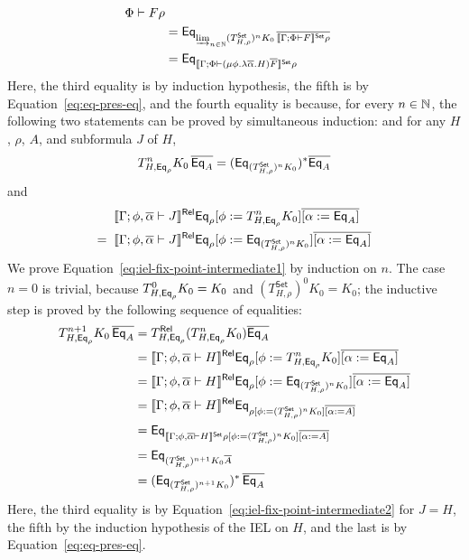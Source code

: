 \documentclass{lmcs}
\theoremstyle{plain}\newtheorem{satz}[thm]{Satz}
\newcommand{\set}{\mathsf{Set}}
\begin{document}
\begin{itemize}
\[\begin{split}
{{{{        \Phi \vdash F}\rho}}}\\ 
&= \Eq_{\colim{n \in \nat}{ (T^\set_{H,\rho})^n K_0\,
    \ol{\setsem{\Gamma; \Phi \vdash F}\rho}}}\\
&= \Eq_{\setsem{\Gamma; \Phi \vdash (\mu \phi.\lambda
      \ol{\alpha}. H)\ol{F}}\rho}
\end{split}
\]
Here, the third equality is by induction hypothesis, the fifth is by
Equation~\ref{eq:eq-pres-eq}, and the fourth equality is because, for
every $n \in \mathbb{N}$, the following two statements can be proved by
simultaneous induction: and for any $H$, $\rho$, $A$, and subformula
$J$ of $H$,
\begin{equation}\label{eq:iel-fix-point-intermediate1}
T^n_{H, \Eq_{\rho}} K_0\, \ol{\Eq_A} = (\Eq_{(T^\set_{H, \rho})^n K_0})^*
\ol{\Eq_A}
\end{equation}
and 
\begin{equation}\label{eq:iel-fix-point-intermediate2}
\begin{split}
& \relsem{\Gamma; \phi, \ol{\alpha} \vdash J} \Eq_{\rho} [\phi
    := T^{n}_{H,\Eq_{\rho}} K_0] \overline{[\alpha := \Eq_A]} \\
=\;\; & \relsem{\Gamma; \phi, \ol{\alpha} \vdash J} \Eq_{\rho}
[\phi := \Eq_{(T^\set_{H,\rho})^n K_0}] \overline{[\alpha := \Eq_A]}
\end{split}
\end{equation}
We prove Equation~\ref{eq:iel-fix-point-intermediate1} by induction on
$n$.  The case $n=0$ is trivial, because $T^0_{H,\mathsf{Eq}_{\rho}} K_0 =
K_0$ and $(T^\set_{H,\rho})^0 K_0 = K_0$; the inductive step is proved
by the following sequence of equalities:
\[
\begin{split}
T^{n+1}_{H,\Eq_{\rho}} K_0\, \overline{\Eq_A}
&= T^\rel_{H,\Eq_{\rho}} (T^{n}_{H,\Eq_{\rho}} K_0)
\overline{\Eq_A} \\ 
&= \relsem{\Gamma; \phi, \ol{\alpha} \vdash H} \Eq_{\rho} [\phi
  := T^{n}_{H, \Eq_{\rho}} K_0] \overline{[\alpha :=
    \Eq_A]} \\ 
&= \relsem{\Gamma; \phi, \ol{\alpha} \vdash H} \Eq_{\rho} [\phi
  := \Eq_{(T^\set_{H,\rho})^n K_0}] \overline{[\alpha :=
    \Eq_A]} \\ 
&= \relsem{\Gamma; \phi, \ol{\alpha} \vdash H} \Eq_{\rho [\phi
    := (T^\set_{H,\rho})^n K_0] \overline{[\alpha :=
      A]}} \\ 
&= \Eq_{\setsem{\Gamma; \phi, \ol{\alpha} \vdash H} \rho [\phi
    := (T^\set_{H,\rho})^n K_0] \overline{[\alpha :=
      A]}} \\ 
&= \Eq_{(T^\set_{H,\rho})^{n+1} K_0 \overline{A}} \\ 
&= (\Eq_{(T^\set_{H,\rho})^{n+1} K_0})^*\, \overline{\Eq_A} 
\end{split}
\]
Here, the third equality is by
Equation~\ref{eq:iel-fix-point-intermediate2} for $J = H$, the fifth
by the induction hypothesis of the IEL on $H$, and the last is by
Equation~\ref{eq:eq-pres-eq}.


\end{itemize}
\end{document}
